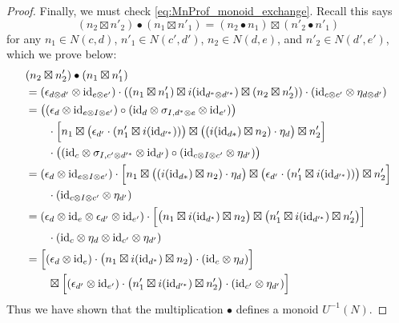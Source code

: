 \documentclass[11pt,oneside,article]{memoir}
\begin{document}
\begin{proof}
   Finally, we must check \eqref{eq:MnProf_monoid_exchange}. Recall this says
   \begin{equation*}
      (n_2\boxtimes n'_2)\bullet(n_1\boxtimes n'_1)=(n_2\bullet n_1)\boxtimes(n'_2\bullet n'_1)
   \end{equation*}
   for any $n_1\in N(c,d)$, $n'_1\in N(c',d')$, $n_2\in N(d,e)$, and $n'_2\in N(d',e')$, which we
   prove below:
   \begin{align*}
      &(n_2\boxtimes n'_2)\bullet(n_1\boxtimes n'_1) \\
      &= (\epsilon_{d\otimes d'}\otimes\mathrm{id}_{e\otimes e'})
         \cdot \left((n_1\boxtimes n'_1)\boxtimes i(\mathrm{id}_{d^*\otimes d'^{*}})
            \boxtimes(n_2\boxtimes n'_2)\right)
         \cdot (\mathrm{id}_{c\otimes c'}\otimes\eta_{d\otimes d'}) \\
      &= \bigl((\epsilon_d\otimes\mathrm{id}_{e\otimes I\otimes e'})
            \circ(\mathrm{id}_d\otimes\sigma_{I,d^*\otimes e}\otimes\mathrm{id}_{e'})\bigr) \\
      &\qquad \cdot \Bigl[n_1\boxtimes\bigl(\epsilon_{d'}\cdot(n'_1\boxtimes i(\mathrm{id}_{d'^{*}}))\bigr)
            \boxtimes \bigl((i(\mathrm{id}_{d*})\boxtimes n_2)\cdot\eta_d\bigr)\boxtimes n'_2\Bigr] \\
      &\qquad \cdot \bigl((\mathrm{id}_c\otimes\sigma_{I,c'\otimes d'^*}\otimes\mathrm{id}_{d'})
            \circ (\mathrm{id}_{c\otimes I\otimes c'}\otimes\eta_{d'}) \bigr) \\
      &= (\epsilon_d\otimes\mathrm{id}_{e\otimes I\otimes e'})
         \cdot \Bigl[n_1\boxtimes\bigl((i(\mathrm{id}_{d*})\boxtimes n_2)\cdot\eta_d\bigr)
            \boxtimes \bigl(\epsilon_{d'}\cdot(n'_1\boxtimes i(\mathrm{id}_{d'^{*}}))\bigr)
            \boxtimes n'_2\Bigr] \\
      &\qquad \cdot (\mathrm{id}_{c\otimes I\otimes c'}\otimes\eta_{d'}) \\
      &= (\epsilon_d\otimes\mathrm{id}_e\otimes\epsilon_{d'}\otimes\mathrm{id}_{e'})
         \cdot \Bigl[\bigl(n_1\boxtimes i(\mathrm{id}_{d^*})\boxtimes n_2\bigr)
            \boxtimes \bigl(n'_1\boxtimes i(\mathrm{id}_{d'^*})\boxtimes n'_2\bigr)\Bigr] \\
      &\qquad \cdot(\mathrm{id}_c\otimes\eta_d\otimes\mathrm{id}_{c'}\otimes\eta_{d'}) \\
      &= \Bigl[(\epsilon_d\otimes\mathrm{id}_e)
            \cdot \bigl(n_1\boxtimes i(\mathrm{id}_{d^*})\boxtimes n_2\bigr)
            \cdot (\mathrm{id}_c\otimes\eta_d)\Bigr] \\
      &\qquad \boxtimes \Bigl[(\epsilon_{d'}\otimes\mathrm{id}_{e'})
            \cdot \bigl(n'_1\boxtimes i(\mathrm{id}_{d'^*})\boxtimes n'_2\bigr)
            \cdot (\mathrm{id}_{c'}\otimes\eta_{d'})\Bigr]
   \end{align*}
   Thus we have shown that the multiplication $\bullet$ defines a monoid $U^{-1}(N)$.


\end{proof}
\end{document}
